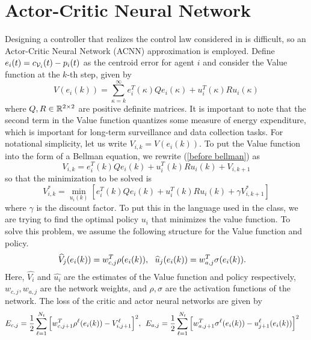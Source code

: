 \documentclass[11pt]{article}
\begin{document}
\section{Actor-Critic Neural Network}
Designing a controller that realizes the control law considered in \cite{Cortes:2004} is difficult, so an Actor-Critic Neural Network (ACNN) approximation is employed. Define $e_i(t) = c_{\mathcal{V}_i}(t) - p_i(t)$ as the centroid error for agent $i$ and  consider the Value function at the $k$-th step, given by 
\begin{equation}
	\label{before bellman}
	\displaystyle V(e_i(k)) = \sum\limits_{\kappa = k}^{\infty}{e_i^T(\kappa)Qe_i(\kappa) + u_i^T(\kappa)Ru_i(\kappa)}
\end{equation}
where $Q, R \in \mathbb{R}^{2 \times 2}$ are positive definite matrices. It is important to note that the second term in the Value function quantizes some measure of energy expenditure, which is important for long-term surveillance and data collection tasks. For notational simplicity, let us write $V_{i,k} = V(e_i(k))$. To put the Value function into the form of a Bellman equation, we rewrite (\ref{before bellman}) as 
\begin{equation}
	\displaystyle V_{i,k} = e_i^T(k)Qe_i(k) + u_i^T(k)Ru_i(k) + V_{i, k+1}
\end{equation}
so that the minimization to be solved is 
\begin{equation}
	\displaystyle V_{i,k}^* = \min\limits_{u_i(k)}{\left[e_i^T(k)Qe_i(k) + u_i^T(k)Ru_i(k) + \gamma V^*_{i, k+1}\right]}
\end{equation}
where $\gamma$ is the discount factor. To put this in the language used in the class, we are trying to find the optimal policy $u_i$ that minimizes the value function. To solve this problem, we assume the following structure for the Value function and policy.
\begin{align}
	\displaystyle &\widehat{V}_j(e_i(k)) = w^T_{c, j} \rho(e_i(k)), \:\:\: \widehat{u}_j(e_i(k)) = w^T_{a, j} \sigma(e_i(k)).
\end{align}
Here, $\widehat{V_i}$ and $\widehat{u_i}$ are the estimates of the Value function and policy respectively, $w_{c,j}, w_{a, j}$ are the network weights, and $\rho, \sigma$ are the activation functions of the network. The loss of the critic and actor neural networks are given by 
\begin{align}
	\label{critic loss}
	\displaystyle &E_{c,j} = \frac{1}{2}\sum\limits_{\ell=1}^{N_t}{\left[ w^T_{c,j+1}\rho^\ell(e_i(k)) - V_{i,j+1}^\ell\right]^2}, \:\:E_{a,j} = \frac{1}{2}\sum\limits_{\ell=1}^{N_t}{\left[w_{a,j+1}^T\sigma^\ell(e_i(k)) - u_{j+1}^\ell(e_i(k)) \right]^2}
\end{align}
\end{document}
